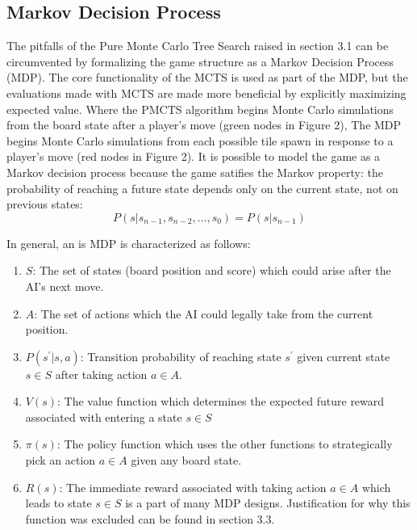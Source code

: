\documentclass{article}
\begin{document}
\subsection{Markov Decision Process}
The pitfalls of the Pure Monte Carlo Tree Search raised in section 3.1 can be circumvented by formalizing the game structure as a Markov Decision Process (MDP).  The core functionality of the MCTS is used as part of the MDP, but the evaluations made with MCTS are made more beneficial by explicitly maximizing expected value.  Where the PMCTS algorithm begins Monte Carlo simulations from the board state after a player's move (green nodes in Figure 2), The MDP begins Monte Carlo simulations from each possible tile spawn in response to a player's move (red nodes in Figure 2).  It is possible to model the game as a Markov decision process because the game satifies the Markov property: the probability of reaching a future state depends only on the current state, not on previous states: 
$$P(s|s_{n-1}, s_{n-2},...,s_{0}) = P(s|s_{n-1}) $$

In general, an is MDP is characterized as follows:
\begin{enumerate}
	\item $S$: The set of states (board position and score) which could arise after the AI's next move.
	\item $A$: The set of actions which the AI could legally take from the current position.
	\item $P(s^\prime | s, a)$: Transition probability of reaching state $s^\prime$ given current state $s \in S$ after taking action $a \in A$.
	\item $V(s)$: The value function which determines the expected future reward associated with entering a state $s \in S$
	\item $\pi(s)$: The policy function which uses the other functions to strategically pick an action $a \in A$ given any board state.
	\item $R(s)$: The immediate reward associated with taking action $a \in A$ which leads to state $s \in S$ is a part of many MDP designs.  Justification for why this function was excluded can be found in section 3.3.
\end{enumerate}
\end{document}
